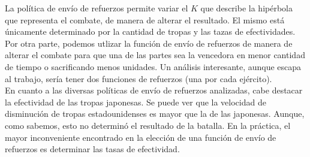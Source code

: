 \documentclass{sig-alternate}
\begin{document}
La política de envío de refuerzos permite variar el $K$ que describe la
hip\'erbola que representa el combate, de manera de alterar el
resultado. El mismo está \'unicamente determinado
por la cantidad de tropas y las tazas de efectividades. 
Por otra parte, podemos utlizar la funci\'on de envío de refuerzos de
manera de alterar el combate para que una de las partes sea la vencedora en menor
cantidad de tiempo o sacrificando menos unidades. Un análisis interesante, aunque escapa al trabajo, sería tener dos funciones de refuerzos (una por cada ejército). \\

En cuanto a las diversas políticas de envío de refuerzos analizadas, cabe destacar la efectividad de las tropas japonesas. Se puede ver que la velocidad de disminución de tropas estadounidenses es mayor que la de las japonesas. Aunque, como sabemos, esto no determinó el resultado de la batalla. En la práctica, el mayor inconveniente encontrado en la elección de una función de envío de refuerzos es determinar las tasas de efectividad.  \\
\end{document}

